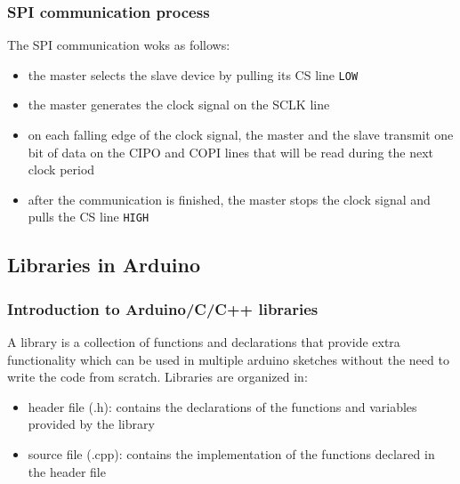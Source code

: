 \subsubsection*{SPI communication process}
The SPI communication woks as follows:
\begin{itemize}
	\item the master selects the slave device by pulling its CS line \texttt{LOW}
	\item the master generates the clock signal on the SCLK line
	\item on each falling edge of the clock signal, the master and the slave transmit one bit of data on the CIPO and COPI
	lines that will be read during the next clock period
	\item after the communication is finished, the master stops the clock signal and pulls the CS line \texttt{HIGH}
\end{itemize}

\subsection{Libraries in Arduino}
\subsubsection*{Introduction to Arduino/C/C++ libraries}
A library is a collection of functions and declarations that provide extra functionality which can be used in multiple
arduino sketches without the need to write the code from scratch. Libraries are organized in:
\begin{itemize}
	\item header file (.h): contains the declarations of the functions and variables provided by the library
	\item source file (.cpp): contains the implementation of the functions declared in the header file
\end{itemize}

